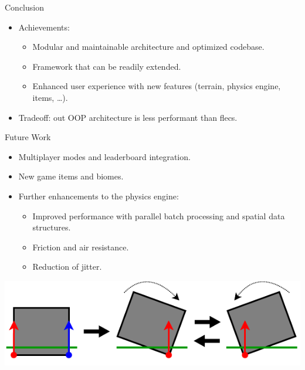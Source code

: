 
\begin{frame}{Conclusion}
    \begin{itemize}
        \item Achievements:
        \begin{itemize}
            \item Modular and maintainable architecture and optimized codebase.
            \item Framework that can be readily extended.
            \item Enhanced user experience with new features (terrain, physics engine, items, \dots).
        \end{itemize}
        \item Tradeoff: out OOP architecture is less performant than flecs.
    \end{itemize}
\end{frame}

\begin{frame}{Future Work}
    \begin{itemize}
        \item Multiplayer modes and leaderboard integration.
        \item New game items and biomes.
        \item Further enhancements to the physics engine:
        \begin{itemize}
            \item Improved performance with parallel batch processing and spatial data structures.
            \item Friction and air resistance.
            \item Reduction of jitter.
        \end{itemize}
    \end{itemize}
    \centering
    \includegraphics[width = .5\textwidth]{../figures/physics/jitter.pdf}
\end{frame}